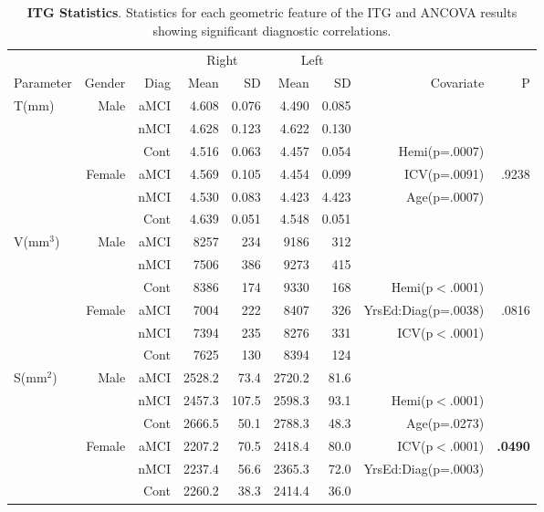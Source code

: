 \documentclass[12pt]{article}\usepackage[]{graphicx}\usepackage[]{color}
\newcommand\T{\rule{0pt}{2.6ex}}
\newcommand\B{\rule[-1.2ex]{0pt}{0pt}}
\begin{document}
\newpage
\begin{sidewaystable}[h]
	\centering
	\footnotesize
	\begin{tabular}{l|rr|rrrr|rr}
	\hline
	& & & \multicolumn{2}{c}{Right} \T & \multicolumn{2}{c|}{Left} & & \\
	\multicolumn{1}{l|}{Parameter} \T\B & Gender & Diag & Mean & SD & Mean & SD & Covariate & P \\
	\hline\hline
	\multirow{6}{*}{T(mm)} & \multirow{3}{*}{Male} & aMCI\T & 4.608 & 0.076 & 4.490 & 0.085 & & \\
							&						& nMCI & 4.628 & 0.123 & 4.622 & 0.130 & & \\
							&						& Cont & 4.516 & 0.063 & 4.457 & 0.054 & Hemi(p=.0007) & \\\cline{2-7}	
							&	\multirow{3}{*}{Female}	& aMCI\T & 4.569 & 0.105 & 4.454 & 0.099 & ICV(p=.0091) & .9238 \\
							&						& nMCI & 4.530 & 0.083 & 4.423 & 4.423 & Age(p=.0007) & \\
							&						& Cont & 4.639 & 0.051 & 4.548 & 0.051 & & \\
	\hline
	\multirow{6}{*}{V(mm$^3$)} & \multirow{3}{*}{Male} & aMCI\T & 8257 & 234 & 9186 & 312 & &  \\
							&						& nMCI & 7506 & 386 & 9273 & 415 & & \\
							&						& Cont & 8386 & 174 & 9330 & 168 & Hemi(p$<$.0001) & \\\cline{2-7}
							&	\multirow{3}{*}{Female}	& aMCI\T & 7004 & 222 & 8407 & 326 & YrsEd:Diag(p=.0038) & .0816 \\
							&						& nMCI & 7394 & 235 & 8276 & 331 & ICV(p$<$.0001) & \\
							&						& Cont & 7625 & 130 & 8394 & 124 & & \\

	\hline
	\multirow{6}{*}{S(mm$^2$)} & \multirow{3}{*}{Male} & aMCI\T & 2528.2 & 73.4 & 2720.2 & 81.6 & & \\
							&						& nMCI & 2457.3 & 107.5 & 2598.3 & 93.1 & Hemi(p$<$.0001) & \\
							&						& Cont & 2666.5 & 50.1 & 2788.3 & 48.3 & Age(p=.0273) & \\\cline{2-7}
							&	\multirow{3}{*}{Female}	& aMCI\T & 2207.2 & 70.5 & 2418.4 & 80.0 & ICV(p$<$.0001)& \textbf{.0490}\\
							&						& nMCI & 2237.4 & 56.6 & 2365.3 & 72.0 & YrsEd:Diag(p=.0003)&\\
							&						& Cont & 2260.2 & 38.3 & 2414.4 & 36.0 & & \\
	\end{tabular}
	\caption{\textbf{ITG Statistics}.  Statistics for each geometric feature of the ITG and ANCOVA results showing significant diagnostic correlations.}
	\label{Wave1.ITG.ANCOVA}
\end{sidewaystable}
\end{document}
